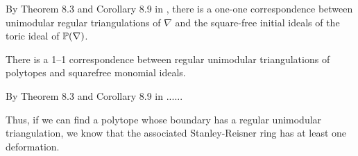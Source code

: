 By Theorem 8.3 and Corollary 8.9 in \cite{sturmfels}, there is a one-one correspondence between unimodular regular triangulations of $\nabla$ and the square-free initial ideals of the toric ideal of $\P(\nabla)$. 

\label{sec:toricgeometry}


\begin{proposition}
\label{eq:unimodular_triangs}
There is a 1--1 correspondence between regular unimodular triangulations of polytopes and squarefree monomial ideals.
\end{proposition}

By Theorem 8.3 and Corollary 8.9 in \cite{sturmfels}......

Thus, if we can find a polytope whose boundary has a regular unimodular triangulation, we know that the associated Stanley-Reisner ring has at least one deformation. 

